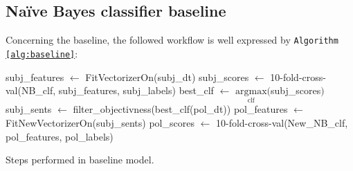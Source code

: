 \subsection{Na\"{i}ve Bayes classifier baseline}
\label{subsec:baseline}
Concerning the baseline, the followed workflow is well expressed by \texttt{Algorithm \ref{alg:baseline}}:
\begin{algorithm}
    \SetAlgoLined
    \DontPrintSemicolon
    \CommentSty{\color{blue}}
        subj\_features $\gets$ FitVectorizerOn(subj\_dt)\;
        subj\_scores $\gets$ 10-fold-cross-val(NB\_clf, subj\_features, subj\_labels)\;
        best\_clf $\gets$ $\underset{\text{clf}}{\mathrm{argmax}} \bigr($subj\_scores$\bigl)$\;
        subj\_sents $\gets$ filter\_objectivness(best\_clf(pol\_dt))\;
        pol\_features $\gets$ FitNewVectorizerOn(subj\_sents)\;
        pol\_scores $\gets$ 10-fold-cross-val(New\_NB\_clf, pol\_features, pol\_labels)\;
    \caption{Steps performed in baseline model.}
    \label{alg:baseline}
\end{algorithm}

\vspace{-2.0em}
